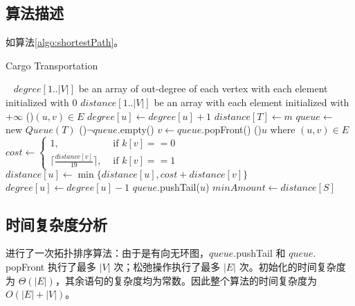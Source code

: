 \documentclass[11pt]{article}
\begin{document}
\subsection*{算法描述}
如算法\ref{algo:shortestPath}。
    \begin{algorithm}
        \caption{Cargo Transportation}\label{algo:shortestPath}
        \
        \Var $degree[1..|V|]$ be an array of out-degree of each vertex with each element initialized with 0\;
        \Var $distance[1..|V|]$ be an array with each element initialized with $+\infty$\;        
        \ForAll(){$(u, v)\in E$}{
            $degree[u] \leftarrow degree[u] + 1$\;
        }
        $distance[T] \leftarrow m$\;
        \Var $queue \leftarrow$ new $Queue(T)$\;
          \; 
        \While(){$\lnot queue.$empty()}{
            $v \leftarrow queue.$popFront()\;
            \ForAll(){$u$ where $(u, v) \in E$}{
                $cost \leftarrow \begin{cases}1, & \text{ if }k[v]==0 \\\lceil\frac{distance[v]}{19}\rceil, & \text{ if }k[v]==1    \end{cases}$\;
                $distance[u] \leftarrow \min\{distance[u], cost + distance[v]\}$\;
                $degree[u] \leftarrow degree[u] - 1$\;
                 {
                    $queue.$pushTail($u$)\;
                }
            }
        } 
        $minAmount \leftarrow distance[S]$\;
    \end{algorithm}

\subsection*{时间复杂度分析}
    进行了一次拓扑排序算法：由于是有向无环图，$queue.$pushTail 和 $queue.$popFront 执行了最多 $|V|$ 次；松弛操作执行了最多 $|E|$ 次。初始化的时间复杂度为 $\Theta(|E|)$，其余语句的复杂度均为常数。因此整个算法的时间复杂度为 $O(|E|+|V|)$。
\end{document}
